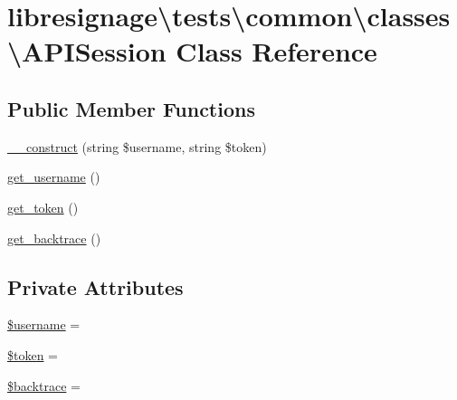 \hypertarget{classlibresignage_1_1tests_1_1common_1_1classes_1_1APISession}{}\section{libresignage\textbackslash{}tests\textbackslash{}common\textbackslash{}classes\textbackslash{}A\+P\+I\+Session Class Reference}
\label{classlibresignage_1_1tests_1_1common_1_1classes_1_1APISession}
\subsection*{Public Member Functions}
\begin{DoxyCompactItemize}
\item 
\hyperlink{classlibresignage_1_1tests_1_1common_1_1classes_1_1APISession_aebc62a44ce0db0a51831237a2bb87676}{\+\_\+\+\_\+construct} (string \$username, string \$token)
\item 
\hyperlink{classlibresignage_1_1tests_1_1common_1_1classes_1_1APISession_a9e2a47f2bea0a608814bf9ac063d5204}{get\+\_\+username} ()
\item 
\hyperlink{classlibresignage_1_1tests_1_1common_1_1classes_1_1APISession_af932e2df3937b4d148061dd0c692f757}{get\+\_\+token} ()
\item 
\hyperlink{classlibresignage_1_1tests_1_1common_1_1classes_1_1APISession_a4b45331e08046a4efbe77f0e031ee117}{get\+\_\+backtrace} ()
\end{DoxyCompactItemize}
\subsection*{Private Attributes}
\begin{DoxyCompactItemize}
\item 
\hyperlink{classlibresignage_1_1tests_1_1common_1_1classes_1_1APISession_a5f8811486f84ad9c70a4e856c98cb84b}{\$username} = \textquotesingle{}\textquotesingle{}
\item 
\hyperlink{classlibresignage_1_1tests_1_1common_1_1classes_1_1APISession_a0e3c8baa3c4bdc0d869ede904eb3fc3c}{\$token} = \textquotesingle{}\textquotesingle{}
\item 
\hyperlink{classlibresignage_1_1tests_1_1common_1_1classes_1_1APISession_a99a8c33c91ede9b9ee2b2d3a2d7df7a3}{\$backtrace} = \textquotesingle{}\textquotesingle{}
\end{DoxyCompactItemize}


